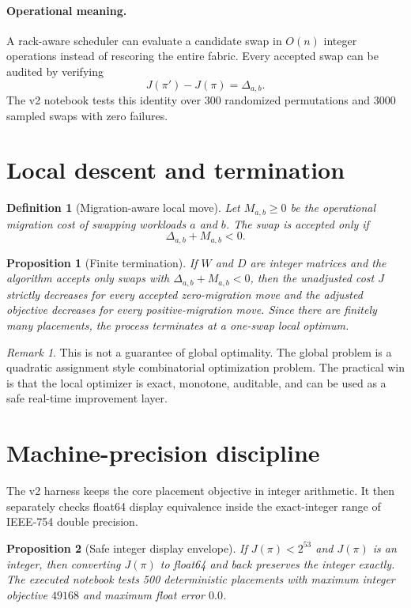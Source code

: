 \documentclass[11pt]{article}
\newtheorem{definition}{Definition}[section]
\newtheorem{proposition}{Proposition}[section]
\theoremstyle{remark}
\newtheorem{remark}{Remark}[section]
\begin{document}
\paragraph{Operational meaning.} A rack-aware scheduler can evaluate a candidate swap in $O(n)$ integer operations instead of rescoring the entire fabric. Every accepted swap can be audited by verifying
\[
J(\pi')-J(\pi)=\Delta_{a,b}.
\]
The v2 notebook tests this identity over 300 randomized permutations and 3000 sampled swaps with zero failures.

\section{Local descent and termination}

\begin{definition}[Migration-aware local move]
Let $M_{a,b}\ge 0$ be the operational migration cost of swapping workloads $a$ and $b$. The swap is accepted only if
\[
\Delta_{a,b}+M_{a,b}<0.
\]
\end{definition}

\begin{proposition}[Finite termination]
If $W$ and $D$ are integer matrices and the algorithm accepts only swaps with $\Delta_{a,b}+M_{a,b}<0$, then the unadjusted cost $J$ strictly decreases for every accepted zero-migration move and the adjusted objective decreases for every positive-migration move. Since there are finitely many placements, the process terminates at a one-swap local optimum.
\end{proposition}

\begin{remark}
This is not a guarantee of global optimality. The global problem is a quadratic assignment style combinatorial optimization problem. The practical win is that the local optimizer is exact, monotone, auditable, and can be used as a safe real-time improvement layer.
\end{remark}

\section{Machine-precision discipline}

The v2 harness keeps the core placement objective in integer arithmetic. It then separately checks float64 display equivalence inside the exact-integer range of IEEE-754 double precision.

\begin{proposition}[Safe integer display envelope]
If $J(\pi)<2^{53}$ and $J(\pi)$ is an integer, then converting $J(\pi)$ to float64 and back preserves the integer exactly. The executed notebook tests 500 deterministic placements with maximum integer objective $49168$ and maximum float error $0.0$.
\end{proposition}
\end{document}
